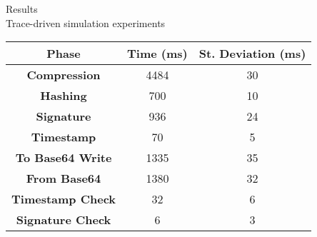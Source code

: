 \begin{frame}{Results \\ \small Trace-driven simulation experiments}
\begin{tabular}{|c|c|c|}\hline
\textbf{Phase} & \textbf{Time} (ms) & \textbf{St. Deviation} (ms) \\ \hline
\textbf{Compression }& 4484 & 30 \\ \hline
\textbf{Hashing} & 700 & 10  \\ \hline
\textbf{Signature} & 936 & 24  \\ \hline
\textbf{Timestamp} & 70 & 5  \\ \hline
\textbf{To Base64 Write} & 1335 & 35  \\ \hline
\textbf{From Base64 }& 1380 & 32  \\ \hline
\textbf{Timestamp Check} & 32  & 6  \\ \hline
\textbf{Signature Check} & 6 & 3  \\ \hline
\end{tabular}
\end{frame}




